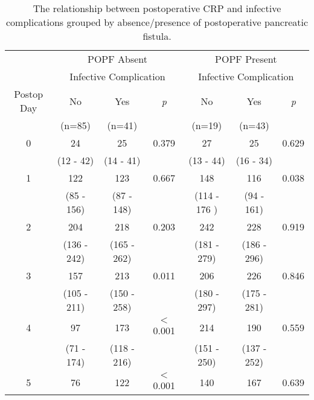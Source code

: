 \begin{table}[h]
	\centering
	\caption{The relationship between postoperative CRP and infective complications grouped by absence/presence of postoperative pancreatic fistula.}
	\label{table:crp_comp_vs_infections_popf_y1n0}
	\begin{tabular}{| c | c c c | c c c |}
		\hline
		           &      \multicolumn{3}{c|}{POPF Absent}       &      \multicolumn{3}{c|}{POPF Present}      \\
		           & \multicolumn{3}{c|}{Infective Complication} & \multicolumn{3}{c|}{Infective Complication} \\
		Postop Day & No          & Yes         & \textit{p}      & No           & Yes         & \textit{p}     \\
		           & (n=85)      & (n=41)      &                 & (n=19)       & (n=43)      &  \\ \hline
		0          & 24          & 25          & 0.379           & 27           & 25          & 0.629          \\
		           & (12 - 42)   & (14 - 41)   &                 & (13 - 44)    & (16 - 34)   &  \\
		1          & 122         & 123         & 0.667           & 148          & 116         & 0.038          \\
		           & (85 - 156)  & (87 - 148)  &                 & (114 - 176 ) & (94 - 161)  &  \\
		2          & 204         & 218         & 0.203           & 242          & 228         & 0.919          \\
		           & (136 - 242) & (165 - 262) &                 & (181 - 279)  & (186 - 296) &  \\
		3          & 157         & 213         & 0.011           & 206          & 226         & 0.846          \\
		           & (105 - 211) & (150 - 258) &                 & (180 - 297)  & (175 - 281) &  \\
		4          & 97          & 173         & $<$0.001        & 214          & 190         & 0.559          \\
		           & (71 - 174)  & (118 - 216) &                 & (151 - 250)  & (137 - 252) &  \\
		5          & 76          & 122         & $<$0.001        & 140          & 167         & 0.639          \\

\end{tabular}
\end{table}
